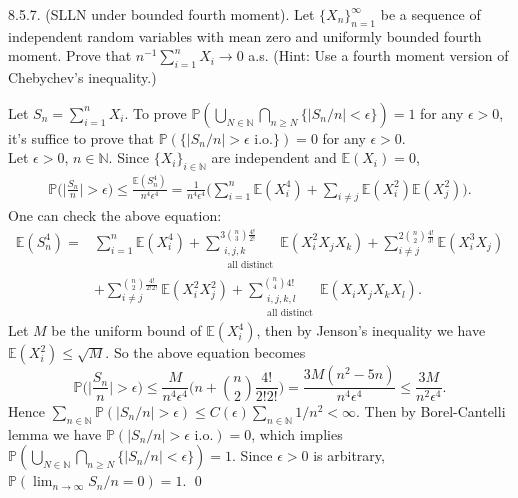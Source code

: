 \begin{exercise}8.5.7. (SLLN under bounded fourth moment). Let $\{X_n\}^\infty_{n=1}$ be a sequence of independent random variables with mean zero and uniformly bounded fourth moment. Prove that $n^{-1} \sum^n_{i=1} X_i \rightarrow 0$ a.s. (Hint: Use a fourth moment
version of Chebychev’s inequality.)
\end{exercise}
\begin{answer}
Let $S_n=\sum_{i=1}^nX_i$. To prove $\mathbb{P}(\bigcup_{N\in\mathbb{N}}\bigcap_{n\geq N}\{|S_n/n|<\epsilon\}) = 1$ for any $\epsilon>0$, it's suffice to prove that  $\mathbb{P}(\big\{|S_n/n|>\epsilon\text{ i.o.}\big\})=0$ for any $\epsilon>0$.\\
Let $\epsilon>0$, $n\in\mathbb{N}$. Since $\{X_i\}_{i\in\mathbb{N}}$ are independent and $\mathbb{E}(X_i)=0$,
\begin{equation*}
    \begin{aligned}
        \mathbb{P}\Big(\Big|\frac{S_n}{n}\Big|>\epsilon\Big)\leq \frac{\mathbb{E}(S_n^4)}{n^4\epsilon^4}
        =\frac{1}{n^4\epsilon^4}\Big(\sum_{i=1}^n\mathbb{E}(X_i^4)+\sum_{i\neq j}\mathbb{E}(X_i^2)\mathbb{E}(X_j^2)\Big).
    \end{aligned}
\end{equation*}
One can check the above equation:
\begin{equation*}
    \begin{aligned}
        \mathbb{E}(S_n^4)=&\sum_{i=1}^n\mathbb{E}(X_i^4)+\sum_{\substack{i,j,k\\\text{ all distinct}}}^{3\binom{n}{3}\frac{4!}{2!}}\mathbb{E}(X_i^2X_jX_k)+\sum^{2\binom{n}{2}\frac{4!}{3!}}_{i\neq j}\mathbb{E}(X_i^3X_j)\\&
        +\sum_{i\neq j}^{\binom{n}{2}\frac{4!}{2!2!}}\mathbb{E}(X_i^2X_j^2)+\sum_{\substack{i,j,k,l\\\text{all distinct}}}^{\binom{n}{4}4!}\mathbb{E}(X_iX_jX_kX_l).
    \end{aligned}
\end{equation*}
Let $M$ be the uniform bound of $\mathbb{E}(X_i^4)$, then by Jenson's inequality we have $\mathbb{E}(X_i^2)\leq\sqrt{M}$. So the above equation becomes
\begin{equation*}
    \mathbb{P}\Big(\Big|\frac{S_n}{n}\Big|>\epsilon\Big)\leq\frac{M}{n^4\epsilon^4}\Big(n+\binom{n}{2}\frac{4!}{2!2!}\Big)=\frac{3M(n^2-5n)}{n^4\epsilon^4}\leq\frac{3M}{n^2\epsilon^4}.
\end{equation*}
Hence $\sum_{n\in\mathbb{N}}\mathbb{P}(|S_n/n|>\epsilon)\leq C(\epsilon)\sum_{n\in\mathbb{N}}1/n^2<\infty$. Then by Borel-Cantelli lemma we have $\mathbb{P}(|S_n/n|>\epsilon\text{ i.o.})=0$, which implies $\mathbb{P}(\bigcup_{N\in\mathbb{N}}\bigcap_{n\geq N}\{|S_n/n|<\epsilon\}) = 1$. Since $\epsilon>0$ is arbitrary, $\mathbb{P}(\lim_{n\rightarrow\infty}S_n/n=0)=1$.
\qed \qquad
\end{answer}

